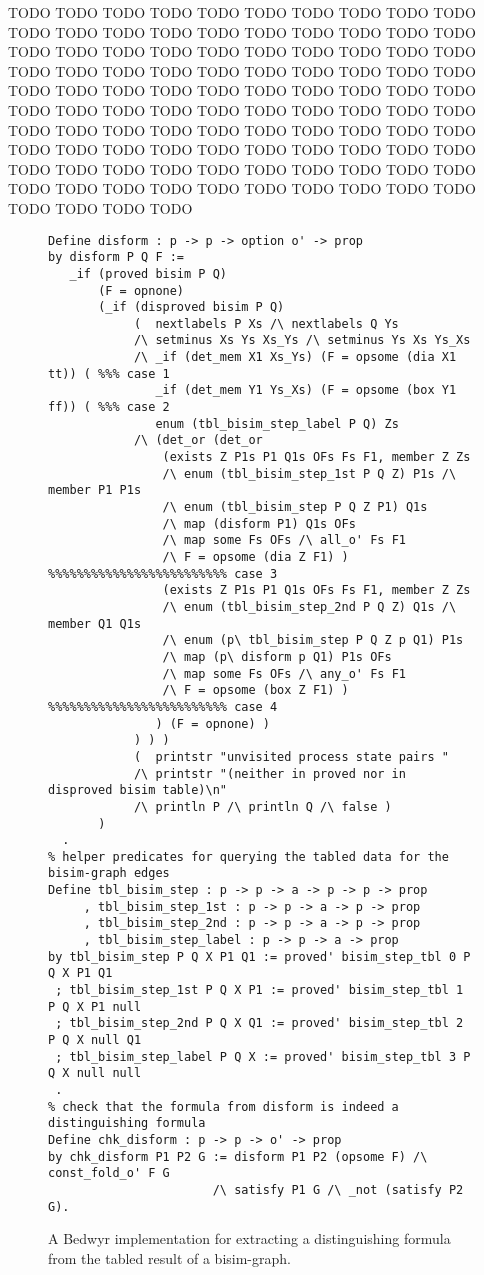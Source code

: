 \documentclass{llncs}
\begin{document}
TODO TODO TODO TODO TODO TODO TODO TODO TODO TODO TODO TODO TODO
TODO TODO TODO TODO TODO TODO TODO TODO TODO TODO TODO TODO TODO
TODO TODO TODO TODO TODO TODO TODO TODO TODO TODO TODO TODO TODO
TODO TODO TODO TODO TODO TODO TODO TODO TODO TODO TODO TODO TODO
TODO TODO TODO TODO TODO TODO TODO TODO TODO TODO TODO TODO TODO
TODO TODO TODO TODO TODO TODO TODO TODO TODO TODO TODO TODO TODO
TODO TODO TODO TODO TODO TODO TODO TODO TODO TODO TODO TODO TODO
TODO TODO TODO TODO TODO TODO TODO TODO TODO TODO TODO TODO TODO

\begin{figure}
\begin{verbatim}
Define disform : p -> p -> option o' -> prop
by disform P Q F :=
   _if (proved bisim P Q)
       (F = opnone)
       (_if (disproved bisim P Q)
            (  nextlabels P Xs /\ nextlabels Q Ys
            /\ setminus Xs Ys Xs_Ys /\ setminus Ys Xs Ys_Xs
            /\ _if (det_mem X1 Xs_Ys) (F = opsome (dia X1 tt)) ( %%% case 1
               _if (det_mem Y1 Ys_Xs) (F = opsome (box Y1 ff)) ( %%% case 2
               enum (tbl_bisim_step_label P Q) Zs
            /\ (det_or (det_or
                (exists Z P1s P1 Q1s OFs Fs F1, member Z Zs
                /\ enum (tbl_bisim_step_1st P Q Z) P1s /\ member P1 P1s
                /\ enum (tbl_bisim_step P Q Z P1) Q1s
                /\ map (disform P1) Q1s OFs
                /\ map some Fs OFs /\ all_o' Fs F1
                /\ F = opsome (dia Z F1) ) %%%%%%%%%%%%%%%%%%%%%%%%% case 3
                (exists Z P1s P1 Q1s OFs Fs F1, member Z Zs
                /\ enum (tbl_bisim_step_2nd P Q Z) Q1s /\ member Q1 Q1s 
                /\ enum (p\ tbl_bisim_step P Q Z p Q1) P1s
                /\ map (p\ disform p Q1) P1s OFs
                /\ map some Fs OFs /\ any_o' Fs F1
                /\ F = opsome (box Z F1) ) %%%%%%%%%%%%%%%%%%%%%%%%% case 4
               ) (F = opnone) )
            ) ) )
            (  printstr "unvisited process state pairs "
            /\ printstr "(neither in proved nor in disproved bisim table)\n"
            /\ println P /\ println Q /\ false )
       )
  .
% helper predicates for querying the tabled data for the bisim-graph edges
Define tbl_bisim_step : p -> p -> a -> p -> p -> prop
     , tbl_bisim_step_1st : p -> p -> a -> p -> prop
     , tbl_bisim_step_2nd : p -> p -> a -> p -> prop
     , tbl_bisim_step_label : p -> p -> a -> prop
by tbl_bisim_step P Q X P1 Q1 := proved' bisim_step_tbl 0 P Q X P1 Q1
 ; tbl_bisim_step_1st P Q X P1 := proved' bisim_step_tbl 1 P Q X P1 null
 ; tbl_bisim_step_2nd P Q X Q1 := proved' bisim_step_tbl 2 P Q X null Q1
 ; tbl_bisim_step_label P Q X := proved' bisim_step_tbl 3 P Q X null null
 .
% check that the formula from disform is indeed a distinguishing formula
Define chk_disform : p -> p -> o' -> prop
by chk_disform P1 P2 G := disform P1 P2 (opsome F) /\ const_fold_o' F G
                       /\ satisfy P1 G /\ _not (satisfy P2 G).
\end{verbatim}
\vspace*{-3ex}
\caption{A Bedwyr implementation for
  extracting a distinguishing formula from the tabled result
  of a bisim-graph.}
\label{fig:hml}
\end{figure}
\end{document}
